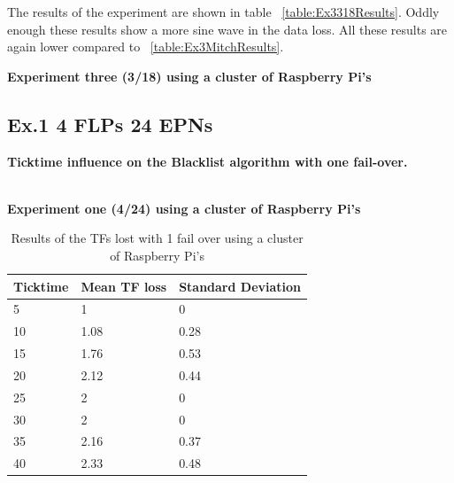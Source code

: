 The results of the experiment are shown in table ~\ref{table:Ex3318Results}. Oddly enough these results show a more sine wave in the data loss. All these results are again lower compared to ~\ref{table:Ex3MitchResults}.

\begin{table}[h!]
\caption*{\textbf{Experiment three (3/18) using a cluster of Raspberry Pi's}}
\caption{Cumulative lost TFs by ticktime/EPN ratio with a random sample size for the Blacklist algorithm}
\label{table:Ex3318Results}
\end{table}

\newpage

\subsection*{Ex.1 4 FLPs 24 EPNs}
\textbf{Ticktime influence on the Blacklist algorithm with one fail-over.}
\\~\\

\begin{table}[h!]
\caption*{\textbf{Experiment one (4/24) using a cluster of Raspberry Pi's}}
\begin{tabular}{| l | l | l |}
\hline
Ticktime & Mean TF loss & Standard Deviation \\ \hline
5 & 1 & 0 \\ \hline
10 & 1.08 & 0.28 \\ \hline
15 & 1.76 & 0.53 \\ \hline
20 & 2.12 & 0.44 \\ \hline
25 & 2 & 0 \\ \hline
30 & 2 & 0 \\ \hline
35 & 2.16 & 0.37 \\ \hline
40 & 2.33 & 0.48 \\ \hline
\end{tabular}
\caption{Results of the TFs lost with 1 fail over using a cluster of Raspberry Pi's}
\label{table:Ex1424Results}
\end{table}


